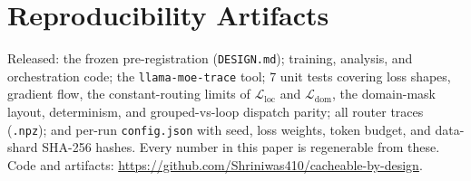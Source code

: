 \documentclass[11pt]{article}
\begin{document}
\section{Reproducibility Artifacts}
\label{app:repro}
Released: the frozen pre-registration (\texttt{DESIGN.md}); training, analysis,
and orchestration code; the \texttt{llama-moe-trace} tool; 7 unit tests covering
loss shapes, gradient flow, the constant-routing limits of
$\mathcal{L}_{\text{loc}}$ and $\mathcal{L}_{\text{dom}}$, the domain-mask
layout, determinism, and grouped-vs-loop dispatch parity; all router traces
(\texttt{.npz}); and per-run \texttt{config.json} with seed, loss weights, token
budget, and data-shard SHA-256 hashes. Every number in this paper is regenerable
from these. Code and artifacts: \url{https://github.com/Shriniwas410/cacheable-by-design}.

\small

\end{document}
